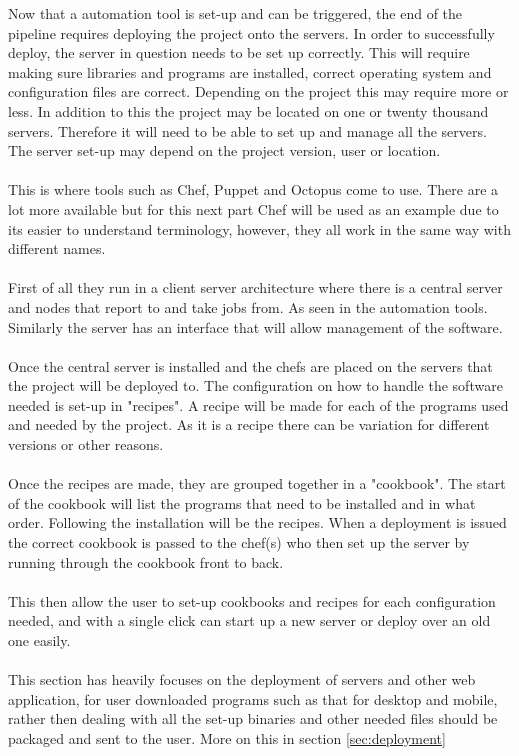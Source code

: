 Now that a automation tool is set-up and can be triggered, the end of the pipeline requires deploying the project onto the servers. In order to successfully deploy, the server in question needs to be set up correctly. This will require making sure libraries and programs are installed, correct operating system and configuration files are correct. Depending on the project this may require more or less.  In addition to this the project may be located on one or twenty thousand servers. Therefore it will need to be able to set up and manage all the servers. The server set-up may depend on the project version, user or location. 
\\\\
This is where tools such as Chef, Puppet and Octopus come to use. There are a lot more available but for this next part Chef will be used as an example due to its easier to understand terminology, however, they all work in the same way with different names.
\\\\
First of all they run in a client server architecture where there is a central server and nodes that report to and take jobs from. As seen in the automation tools. Similarly the server has an interface that will allow management of the software.
\\\\
Once the central server is installed and the chefs are placed on the servers that the project will be deployed to. The configuration on how to handle the software needed is set-up in "recipes". A recipe will be made for each of the programs used and needed by the project. As it is a recipe there can be variation for different versions or other reasons.
\\\\
Once the recipes are made, they are grouped together in a "cookbook". The start of the cookbook will list the programs that need to be installed and in what order. Following the installation will be the recipes. When a deployment is issued the correct cookbook is passed to the chef(s) who then set up the server by running through the cookbook front to back.
\\\\
This then allow the user to set-up cookbooks and recipes for each configuration needed, and with a single click can start up a new server or deploy over an old one easily.
\\\\
This section has heavily focuses on the deployment of servers and other web application, for user downloaded programs such as that for desktop and mobile, rather then dealing with all the set-up binaries and other needed files should be packaged and sent to the user. More on this in section \ref{sec:deployment}
 
